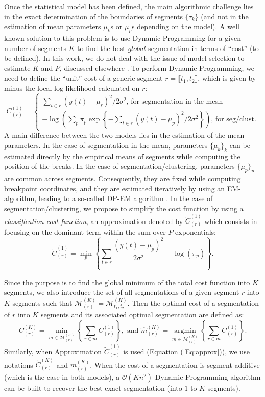 \documentclass[11pt]{llncs}
\begin{document}
Once the statistical model has been defined, the main algorithmic challenge lies in the exact determination of the boundaries of segments $\{\tau_k\}$ (and not in the estimation of mean parameters $\mu_k$s or $\mu_p$s depending on the model). A well known solution to this problem is to use Dynamic Programming for a given number of segments $K$ to find the best $global$ segmentation in terms of ``cost'' (to be defined). In this work, we do not deal with the issue of model selection to estimate $K$ and $P$, discussed elsewhere \cite{picard_statistical_2005,ZS07}. To perform Dynamic Programming, we need to define the ``unit'' cost of a generic segment $r = \llbracket t_1, t_2 \rrbracket$, which is given by minus the local log-likelihood calculated on $r$:
$$ C_{(r)}^{(1)} = 
\begin{cases}
\sum_{t \in r} (y(t) - \mu_r)^2/2 \sigma^2 \text{, for segmentation in the mean}  \\
-\log\left(\sum_p \pi_p \exp \left\{ - \sum_{t \in r} (y(t) - \mu_p)^2 / 2 \sigma^2 \right\}\right) \text{, for seg/clust}.
\end{cases}
$$ 
A main difference between the two models lies in the estimation of the mean parameters. In the case of segmentation in the mean, parameters $\{\mu_k\}_k$ can be estimated directly by the empirical means of segments while computing the position of the breaks. In the case of segmentation/clustering, parameters $\{\mu_p\}_p$ are common across segments. Consequently, they are fixed while computing breakpoint coordinates, and they are estimated iteratively by using an EM-algorithm, leading to a so-called DP-EM algorithm \cite{picard_2007}. In the case of segmentation/clustering, we propose to simplify the cost function by using a \textit{classification cost function}, an approximation denoted by $\widetilde{C}_{(r)}^{(1)}$ which consists in focusing on the dominant term within the sum over $P$ exponentials:
\begin{equation}
\label{Eq:approx}
\widetilde{C}_{(r)}^{(1)}= \min_p \left\{ \sum_{t \in r}\frac{(y(t) - \mu_p)^2} {2\sigma^2 } + \log(\pi_p)\right\}.
\end{equation}

Since the purpose is to find the global minimum of the total cost function into $K$ segments, we also introduce the set of all segmentations of a given segment $r$ into $K$ segments such that $\mathcal{M}^{(K)}_{(r)} = \mathcal{M}^{(K)}_{t_1, t_2}$. Then the optimal cost of a segmentation of $r$ into $K$ segments and its associated optimal segmentation are defined as:
$$
C_{(r)}^{(K)} = \min_{m \in \mathcal{M}^{(K)}_{(r)}} \left\{ \sum_{r \in m} C^{(1)}_{(r)} \right\}, 
\text{ and }
\widehat{m}_{(r)}^{(K)} = \underset{m \in \mathcal{M}^{(K)}_{(r)}}{\operatorname{argmin}} \left\{ \sum_{r \in m} C^{(1)}_{(r)} \right\}.
$$
Similarly, when Approximation $\widetilde{C}_{(r)}^{(1)}$ is used (Equation (\ref{Eq:approx})), we use notations $\widetilde{C}_{(r)}^{(K)}$ and $\widetilde{m}_{(r)}^{(K)}$. When the cost of a segmentation is segment additive (which is the case in both models), a $\mathcal{O}(Kn^2)$ Dynamic Programming algorithm can be built to recover the best exact segmentation (into $1$ to $K$ segments).
\end{document}
